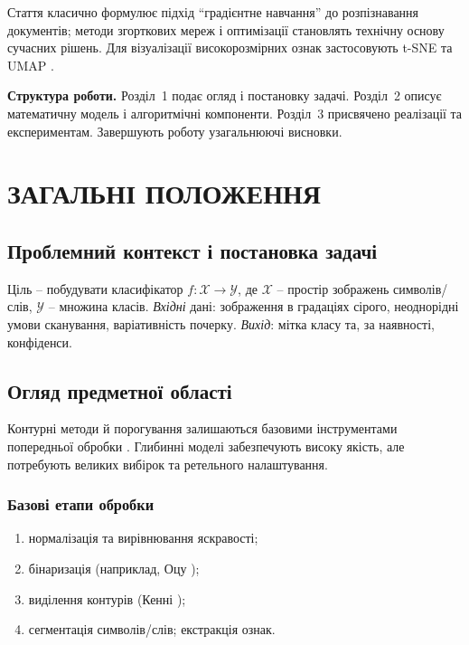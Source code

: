 \documentclass{article}
\begin{document}
Стаття \cite{lecun1998gradient} класично формулює підхід ``градієнтне навчання'' до розпізнавання
документів; методи згорткових мереж \cite{krizhevsky2012imagenet,he2016deep} і оптимізації \cite{kingma2014adam}
становлять технічну основу сучасних рішень. Для візуалізації високорозмірних ознак застосовують
t-SNE \cite{tsne2008} та UMAP \cite{umap2018}.

\textbf{Структура роботи.} Розділ~1 подає огляд і постановку задачі. Розділ~2 описує
математичну модель і алгоритмічні компоненти. Розділ~3 присвячено реалізації та експериментам.
Завершують роботу узагальнюючі висновки.

\section{ЗАГАЛЬНІ ПОЛОЖЕННЯ}

\subsection{Проблемний контекст і постановка задачі}
Ціль -- побудувати класифікатор $f:\mathcal{X}\to\mathcal{Y}$, де $\mathcal{X}$ -- простір зображень
символів/слів, $\mathcal{Y}$ -- множина класів. \textit{Вхідні} дані: зображення в градаціях сірого,
неоднорідні умови сканування, варіативність почерку. \textit{Вихід}: мітка класу та,
за наявності, конфіденси.

\subsection{Огляд предметної області}
Контурні методи й порогування залишаються базовими інструментами попередньої обробки
\cite{otsu1979,canny1986}. Глибинні моделі \cite{lecun1998gradient,krizhevsky2012imagenet,he2016deep}
забезпечують високу якість, але потребують великих вибірок та ретельного налаштування.

\subsubsection{Базові етапи обробки}
\begin{enumerate}
  \item нормалізація та вирівнювання яскравості;
  \item бінаризація (наприклад, Оцу \cite{otsu1979});
  \item виділення контурів (Кенні \cite{canny1986});
  \item сегментація символів/слів; екстракція ознак.
\end{enumerate}
\end{document}
